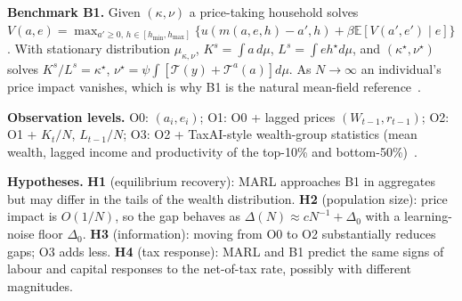 \textbf{Benchmark B1.} Given $(\kappa,\nu)$ a price-taking household solves
$V(a,e)=\max_{a'\ge0,\,h\in[h_{\min},h_{\max}]}\{u(m(a,e,h)-a',h)+\beta\mathbb E[V(a',e')\mid e]\}$. With stationary
distribution $\mu_{\kappa,\nu}$, $K^s=\int a\,d\mu$, $L^s=\int eh^\star d\mu$, and $(\kappa^\star,\nu^\star)$ solves
$K^s/L^s=\kappa^\star$, $\nu^\star=\psi\int[\mathcal T(y)+\mathcal T^a(a)]d\mu$. As $N\to\infty$ an individual's
price impact vanishes, which is why B1 is the natural mean-field reference~\cite{lasry,xu}.

\textbf{Observation levels.} O0: $(a_i,e_i)$; O1: O0 + lagged prices $(W_{t-1},r_{t-1})$; O2: O1 + $K_t/N$, $L_{t-1}/N$;
O3: O2 + TaxAI-style wealth-group statistics (mean wealth, lagged income and productivity of the top-10\% and
bottom-50\%)~\cite{taxai}.

\textbf{Hypotheses.}
\textbf{H1} (equilibrium recovery): MARL approaches B1 in aggregates but may differ in the tails of the wealth distribution.
\textbf{H2} (population size): price impact is $O(1/N)$, so the gap behaves as $\Delta(N)\approx cN^{-1}+\Delta_0$ with a learning-noise floor $\Delta_0$.
\textbf{H3} (information): moving from O0 to O2 substantially reduces gaps; O3 adds less.
\textbf{H4} (tax response): MARL and B1 predict the same signs of labour and capital responses to the net-of-tax rate, possibly with different magnitudes.
